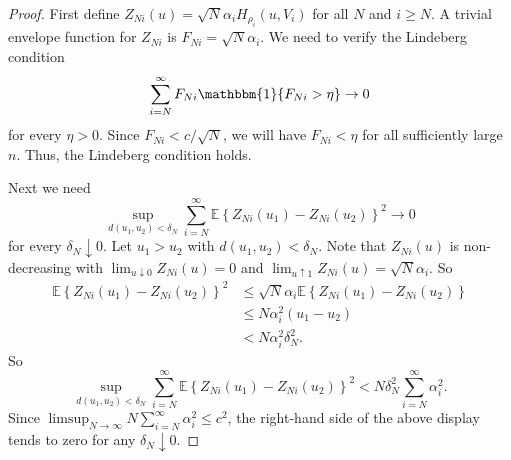 \documentclass[11pt,a4paper]{article}
\newcommand{\E}{\mathbb{E}}
\begin{document}
\begin{appendices}
\begin{proof}
First define $Z_{Ni}(u) = \sqrt{N}\alpha_{i}H_{\rho_{i}}(u,V_{i})$ for all $N$ and $i \geq N$. A trivial envelope function for $Z_{Ni}$ is $F_{Ni} = \sqrt{N}\alpha_{i}$. We need to verify the Lindeberg condition
\begin{equation*}
    \sum_{i=N}^{\infty} F_{Ni}\mathbbm{1}\{F_{Ni} > \eta\} \rightarrow 0
\end{equation*}
for every $\eta > 0$. Since $F_{Ni} < c/\sqrt{N}$, we will have $F_{Ni} < \eta$ for all sufficiently large $n$. Thus, the Lindeberg condition holds.

Next we need 
\begin{equation*}
    \sup_{d(u_1,u_2) < \delta_{N}} \sum_{i=N}^{\infty} \E\left\{Z_{Ni}(u_{1})-Z_{Ni}(u_{2})\right\}^{2} \rightarrow 0
\end{equation*}
for every $\delta_{N} \downarrow 0$. Let $u_{1} > u_{2}$ with $d(u_1,u_2) < \delta_{N}$. Note that $Z_{Ni}(u)$ is non-decreasing with $\lim_{u \downarrow 0}Z_{Ni}(u) = 0$ and $\lim_{u \uparrow 1}Z_{Ni}(u) = \sqrt{N}\alpha_{i}$. So
\begin{align*}
    \E\left\{Z_{Ni}(u_{1})-Z_{Ni}(u_{2})\right\}^{2} &\leq \sqrt{N}\alpha_{i}\E\left\{Z_{Ni}(u_{1})-Z_{Ni}(u_{2})\right\} \\
    &\leq N\alpha_{i}^{2}(u_{1}-u_{2})\\
    &< N\alpha_{i}^{2}\delta_{N}^{2}.
\end{align*}
So
\begin{equation*}
    \sup_{d(u_1,u_2) < \delta_{N}} \sum_{i=N}^{\infty} \E\left\{Z_{Ni}(u_{1})-Z_{Ni}(u_{2})\right\}^{2} < N\delta_{N}^{2} \sum_{i=N}^{\infty} \alpha_{i}^{2}.
\end{equation*}
Since $\limsup_{N \rightarrow \infty} N \sum_{i=N}^{\infty} \alpha_{i}^{2} \leq c^{2}$, the right-hand side of the above display tends to zero for any $\delta_{N} \downarrow 0$.


\end{proof}
\end{appendices}
\end{document}
